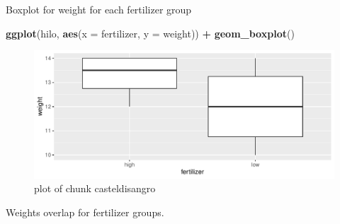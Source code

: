 \documentclass[ignorenonframetext,]{beamer}
\newenvironment{Shaded}{\begin{snugshade}}{\end{snugshade}}
\newcommand{\DataTypeTok}[1]{\textcolor[rgb]{0.13,0.29,0.53}{#1}}
\newcommand{\KeywordTok}[1]{\textcolor[rgb]{0.13,0.29,0.53}{\textbf{#1}}}
\newcommand{\NormalTok}[1]{#1}
\newcommand{\OperatorTok}[1]{\textcolor[rgb]{0.81,0.36,0.00}{\textbf{#1}}}
\newcommand{\StringTok}[1]{\textcolor[rgb]{0.31,0.60,0.02}{#1}}
\begin{document}
\begin{frame}[fragile]{Boxplot for weight for each fertilizer group}
\protect\hypertarget{boxplot-for-weight-for-each-fertilizer-group}{}

\begin{Shaded}
\begin{Highlighting}[]
\KeywordTok{ggplot}\NormalTok{(hilo, }\KeywordTok{aes}\NormalTok{(}\DataTypeTok{x =}\NormalTok{ fertilizer, }\DataTypeTok{y =}\NormalTok{ weight)) }\OperatorTok{+}\StringTok{ }\KeywordTok{geom_boxplot}\NormalTok{()}
\end{Highlighting}
\end{Shaded}

\begin{figure}
\centering
\includegraphics{figure/casteldisangro-1.pdf}
\caption{plot of chunk casteldisangro}
\end{figure}

Weights overlap for fertilizer groups.

\end{frame}
\end{document}
